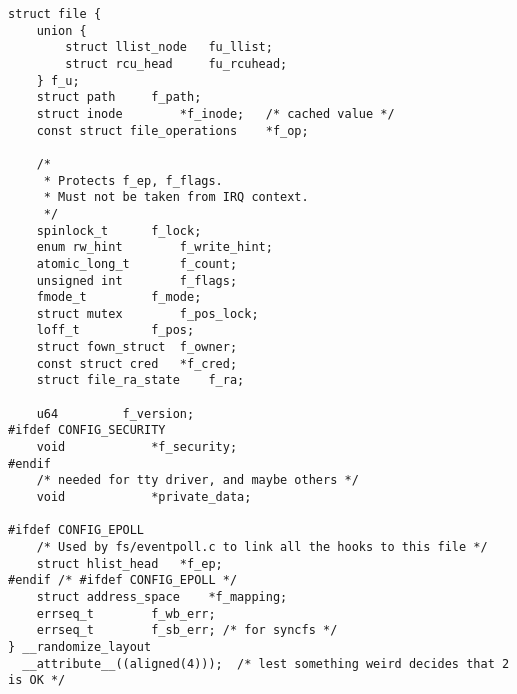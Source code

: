 
\begin{lstlisting}
struct file {
	union {
		struct llist_node	fu_llist;
		struct rcu_head 	fu_rcuhead;
	} f_u;
	struct path		f_path;
	struct inode		*f_inode;	/* cached value */
	const struct file_operations	*f_op;

	/*
	 * Protects f_ep, f_flags.
	 * Must not be taken from IRQ context.
	 */
	spinlock_t		f_lock;
	enum rw_hint		f_write_hint;
	atomic_long_t		f_count;
	unsigned int 		f_flags;
	fmode_t			f_mode;
	struct mutex		f_pos_lock;
	loff_t			f_pos;
	struct fown_struct	f_owner;
	const struct cred	*f_cred;
	struct file_ra_state	f_ra;

	u64			f_version;
#ifdef CONFIG_SECURITY
	void			*f_security;
#endif
	/* needed for tty driver, and maybe others */
	void			*private_data;

#ifdef CONFIG_EPOLL
	/* Used by fs/eventpoll.c to link all the hooks to this file */
	struct hlist_head	*f_ep;
#endif /* #ifdef CONFIG_EPOLL */
	struct address_space	*f_mapping;
	errseq_t		f_wb_err;
	errseq_t		f_sb_err; /* for syncfs */
} __randomize_layout
  __attribute__((aligned(4)));	/* lest something weird decides that 2 is OK */
\end{lstlisting}
